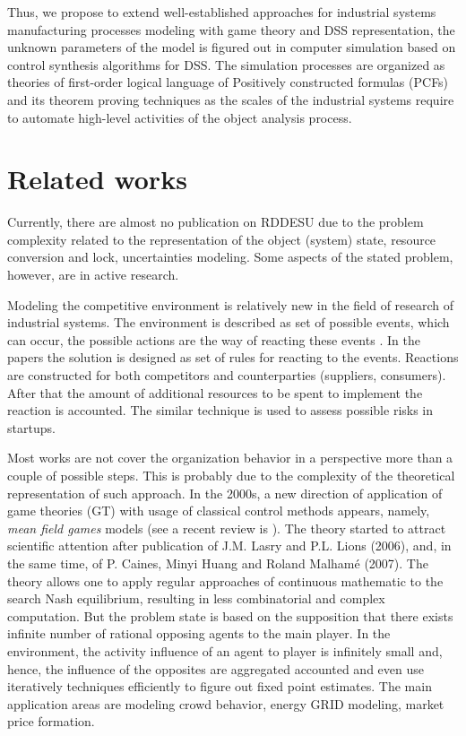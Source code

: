 \documentclass[runningheads]{llncs}
\begin{document}
Thus, we propose to extend well-established approaches for industrial systems manufacturing processes modeling with game theory and DSS representation, the unknown parameters of the model is figured out in computer simulation based on control synthesis algorithms for DSS.  The simulation processes are organized as theories of first-order logical language of Positively constructed formulas (PCFs) and its theorem proving techniques as the scales of the industrial systems require to automate high-level activities of the object analysis process.

\section{Related works}
\label{sec:rel-works}

Currently, there are almost no publication on RDDESU due to the problem complexity related to the representation of the object (system) state, resource conversion and lock, uncertainties modeling.  Some aspects of the stated problem, however, are in active research.

Modeling the competitive environment is relatively new in the field of research of industrial systems. The environment is described as set of possible events, which can occur, the possible actions are the way of reacting these events \cite{andres}. In the papers the solution is designed as set of rules for reacting to the events. Reactions are constructed for both competitors and counterparties (suppliers, consumers). After that the amount of additional resources to be spent to implement the reaction is accounted.  The similar technique is used to assess possible risks in startups.

Most works are not cover the organization behavior in a perspective more than a couple of possible steps. This is probably due to the complexity of the theoretical representation of such approach. In the 2000s, a new direction of application of game theories (GT) with usage of classical control methods appears, namely, \emph{mean field games} models (see a recent review is \cite{gomes}). The theory started to attract scientific attention after publication of J.M. Lasry and P.L. Lions (2006), and,  in the same time, of P. Caines, Minyi Huang and Roland Malhamé (2007). The theory allows one to apply regular approaches of continuous mathematic to the search Nash equilibrium, resulting in less combinatorial and complex computation. But the problem state is based on the supposition that there exists infinite number of rational opposing agents to the main player. In the environment, the activity influence of an agent to player is infinitely small and, hence, the influence of the opposites are aggregated accounted and even use iteratively techniques efficiently to figure out fixed point estimates. The main application areas are modeling crowd behavior, energy GRID modeling, market price formation.
\end{document}

